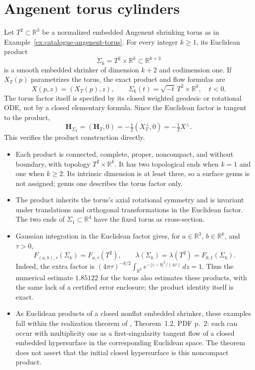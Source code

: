 \chapter{Angenent torus cylinders}\label{sec:catalogue-angenent-torus-cylinders}
\begin{example}\label{ex:catalogue-angenent-torus-cylinders}
Let $T^2\subset\mathbb R^3$ be a normalized embedded Angenent shrinking torus as in Example~\ref{ex:catalogue-angenent-torus}. For every integer $k\geq1$, its Euclidean product
\[
 \Sigma_k=T^2\times\mathbb R^k\subset\mathbb R^{k+3}
\]
is a smooth embedded shrinker of dimension $k+2$ and codimension one. If $X_T(p)$ parametrizes the torus, the exact product and flow formulas are
\[
 X(p,z)=(X_T(p),z),\qquad
 \Sigma_k(t)=\sqrt{-t}\,T^2\times\mathbb R^k,\quad t<0.
\]
The torus factor itself is specified by its closed weighted geodesic or rotational ODE, not by a closed elementary formula. Since the Euclidean factor is tangent to the product,
\[
 \mathbf H_{\Sigma_k}=(\mathbf H_T,0)=-\tfrac12(X_T^\perp,0)
 =-\tfrac12X^\perp.
\]
This verifies the product construction directly.
\begin{itemize}
\item Each product is connected, complete, proper, noncompact, and without boundary, with topology $T^2\times\mathbb R^k$. It has two topological ends when $k=1$ and one when $k\geq2$. Its intrinsic dimension is at least three, so a surface genus is not assigned; genus one describes the torus factor only.
\item The product inherits the torus's axial rotational symmetry and is invariant under translations and orthogonal transformations in the Euclidean factor. The two ends of $\Sigma_1\subset\mathbb R^4$ have the fixed torus as cross-section.
\item Gaussian integration in the Euclidean factor gives, for $a\in\mathbb R^3$, $b\in\mathbb R^k$, and $\tau>0$,
\[
 F_{(a,b),\tau}(\Sigma_k)=F_{a,\tau}(T^2),\qquad
 \lambda(\Sigma_k)=\lambda(T^2)=F_{0,1}(\Sigma_k).
\]
Indeed, the extra factor is $(4\pi\tau)^{-k/2}\int_{\mathbb R^k}e^{-|z-b|^2/(4\tau)}\,dz=1$. Thus the numerical estimate $1.85122$ for the torus also estimates these products, with the same lack of a certified error enclosure; the product identity itself is exact.
\item As Euclidean products of a closed nonflat embedded shrinker, these examples fall within the realization theorem of \cite{CatCLSZ2026}, Theorem~1.2, PDF p.~2: each can occur with multiplicity one as a first-singularity tangent flow of a closed embedded hypersurface in the corresponding Euclidean space. The theorem does not assert that the initial closed hypersurface is this noncompact product.

\end{itemize}
\end{example}
